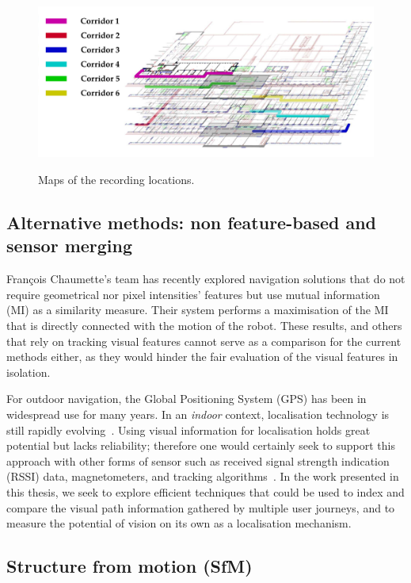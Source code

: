 \begin{figure}[t]
\includegraphics[width=\linewidth]{./gfx/Chapter04/map_and_legend.pdf}\label{fig:visualpathsA}
\caption{Maps of the recording locations.}
\label{fig:map_and_legend}
\end{figure}

\subsection{Alternative methods: non feature-based and sensor merging} 

Fran\c{c}ois Chaumette's team has  recently explored navigation solutions that do not require geometrical nor pixel intensities' features but use mutual information (MI) as a similarity measure. Their system performs a maximisation of the MI that is directly connected with the motion of the robot. These results, and others that rely on tracking visual features \cite{Se2002} cannot serve as a comparison for the current methods either, as they would hinder the fair evaluation of the visual features in isolation.

For outdoor navigation, the Global Positioning System (GPS) has been in widespread use for many years.  In an \textit{indoor} context, localisation technology is still rapidly evolving~\cite{Shen,Wang2012,Quigley2010}. Using visual information for localisation holds great potential but lacks reliability; therefore one would certainly seek to support this approach with other forms of sensor such as received signal strength indication (RSSI) data, magnetometers, and tracking algorithms~\cite{Schroth2011,Schroth2012,Quigley2010}.  In the work presented in this thesis, we seek to explore efficient techniques that could be used to index and compare the visual path information gathered by multiple user journeys, and to measure the potential of vision on its own as a localisation mechanism. 
%

\subsection{Structure from motion (SfM)}

